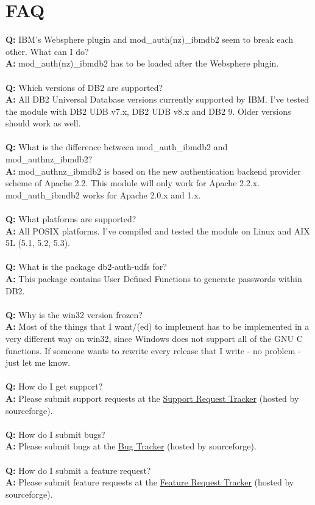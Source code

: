 \documentclass[11pt,a4paper]{article}
\begin{document}
\section{FAQ}
\textbf{Q:} IBM's Websphere plugin and mod\_auth(nz)\_ibmdb2 seem to break each other. What can I do? \\
\textbf{A:} mod\_auth(nz)\_ibmdb2 has to be loaded after the Websphere plugin. \\
\\
\textbf{Q:} Which versions of DB2 are supported? \\
\textbf{A:} All DB2 Universal Database versions currently supported by IBM. I've tested the module with DB2 UDB v7.x, DB2 UDB v8.x and DB2 9. Older versions should work as well. \\
\\
\textbf{Q:} What is the difference between mod\_auth\_ibmdb2 and mod\_authnz\_ibmdb2? \\
\textbf{A:} mod\_authnz\_ibmdb2 is based on the new authentication backend provider scheme of Apache 2.2. This module will only work for Apache 2.2.x. \linebreak[4] mod\_auth\_ibmdb2 works for Apache 2.0.x and 1.x. \\
\\
\textbf{Q:} What platforms are supported? \\
\textbf{A:} All POSIX platforms. I've compiled and tested the module on Linux and AIX 5L (5.1, 5.2, 5.3). \\
\\
\textbf{Q:} What is the package db2-auth-udfs for? \\
\textbf{A:} This package contains User Defined Functions to generate passwords within DB2. \\
\\
\textbf{Q:} Why is the win32 version frozen? \\
\textbf{A:} Most of the things that I want/(ed) to implement has to be implemented in a very different way on win32, since Windows does not support all of the GNU C functions. If someone wants to rewrite every release that I write - no problem - just let me know. \\
\\
\textbf{Q:} How do I get support? \\
\textbf{A:} Please submit support requests at the \href{http://sourceforge.net/tracker/?atid=633718&group_id=103064&func=browse}{Support Request Tracker} (hosted by sourceforge). \\
\\
\textbf{Q:} How do I submit bugs? \\
\textbf{A:} Please submit bugs at the \href{http://sourceforge.net/tracker/?atid=633717&group_id=103064&func=browse}{Bug Tracker} (hosted by sourceforge). \\
\\
\textbf{Q:} How do I submit a feature request? \\
\textbf{A:} Please submit feature requests at the \href{http://sourceforge.net/tracker/?atid=633720&group_id=103064&func=browse}{Feature Request Tracker} (hosted by sourceforge). \\ 
\newpage
\end{document}
